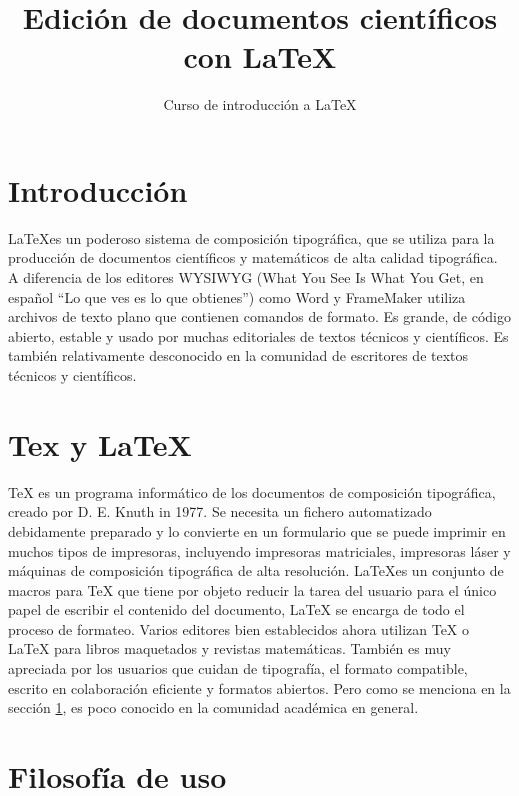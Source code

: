 \documentclass[paper,11pt]{article}
\title{Edición de documentos científicos con \LaTeX}
\author{Curso de introducción a LaTeX}
\begin{document}
\maketitle %

\section{Introducción}
\label{sec:intro}
\LaTeX es un poderoso sistema de composición tipográfica, que se utiliza
para la producción de documentos científicos y matemáticos
de alta calidad tipográfica. A diferencia de los editores WYSIWYG (What You See Is What You Get, en español ``Lo que ves es lo que obtienes'') como Word y FrameMaker 
utiliza archivos de texto plano que contienen 
comandos de formato. Es grande, de código abierto, estable y usado
por muchas editoriales de textos técnicos y científicos. Es
también relativamente desconocido en la comunidad de escritores de textos técnicos y científicos.

\section{Tex y LaTeX}
\label{sec:texvslatex}
TeX es un programa informático de los documentos de composición tipográfica, creado por D. E. Knuth in 1977. Se necesita un fichero automatizado debidamente preparado y lo convierte en un formulario que se puede imprimir en muchos tipos de impresoras, incluyendo impresoras matriciales, impresoras láser y máquinas de composición tipográfica de alta resolución. \LaTeX es un conjunto de macros para TeX que tiene por objeto reducir la tarea del usuario para el único papel de escribir el contenido del documento, LaTeX se encarga de todo el proceso de formateo. Varios editores bien establecidos ahora utilizan TeX o LaTeX para libros maquetados y revistas matemáticas. También es muy apreciada por los usuarios que cuidan de tipografía, el formato compatible, escrito en colaboración eficiente y formatos abiertos. Pero como se menciona en la sección \ref{sec:intro}, es poco conocido en la comunidad académica en general.

\section{Filosofía de uso}
\end{document}
